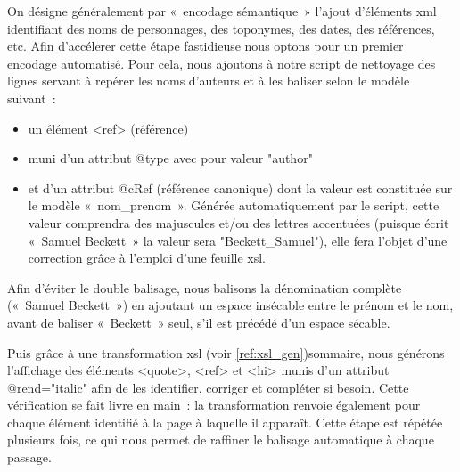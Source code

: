 \documentclass[12pt, a4paper]{article}
\begin{document}
On désigne généralement par «~encodage sémantique~» l'ajout d'éléments xml identifiant des noms de personnages, des toponymes, des dates, des références, etc. Afin d'accélerer cette étape fastidieuse nous optons pour un premier encodage automatisé. Pour cela, nous ajoutons à notre script de nettoyage des lignes servant à repérer les noms d'auteurs et à les baliser selon le modèle suivant~:
\begin{itemize}
    \item un élément <ref> (référence)
    \item muni d'un attribut @type avec pour valeur "author"
    \item et d'un attribut @cRef (référence canonique) dont la valeur est constituée sur le modèle «~nom\_prenom~». Générée automatiquement par le script, cette valeur comprendra des majuscules et/ou des lettres accentuées (puisque \robbe{} écrit «~Samuel Beckett~» la valeur sera "Beckett\_Samuel"), elle fera l'objet d'une correction grâce à l'emploi d'une feuille xsl.
\end{itemize}
Afin d'éviter le double balisage, nous balisons la dénomination complète («~Samuel Beckett~») en ajoutant un espace insécable entre le prénom et le nom, avant de baliser «~Beckett~» seul, s'il est précédé d'un espace sécable.


Puis grâce à une transformation xsl (voir \ref{ref:xsl_gen})sommaire, nous générons l'affichage des éléments <quote>, <ref> et <hi> munis d'un attribut @rend="italic" afin de les identifier, corriger et compléter si besoin. Cette vérification se fait livre en main~: la transformation renvoie également pour chaque élément identifié à la page à laquelle il apparaît. Cette étape est répétée plusieurs fois, ce qui nous permet de raffiner le balisage automatique à chaque passage.
\end{document}
